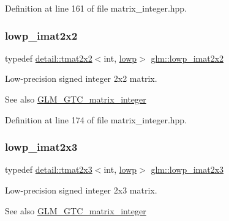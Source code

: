 Definition at line 161 of file matrix\+\_\+integer.\+hpp.

\mbox{\label{group__gtc__matrix__integer_ga05307630bc68a62132a82d1886a0b5e2}} 
\subsubsection{\texorpdfstring{lowp\+\_\+imat2x2}{lowp\_imat2x2}}
{\footnotesize\ttfamily typedef \hyperlink{structglm_1_1detail_1_1tmat2x2}{detail\+::tmat2x2}$<$int, \hyperlink{namespaceglm_a0f04f086094c747d227af4425893f545ae161af3fc695e696ce3bf69f7332bc2d}{lowp}$>$ \hyperlink{group__gtc__matrix__integer_ga05307630bc68a62132a82d1886a0b5e2}{glm\+::lowp\+\_\+imat2x2}}

Low-\/precision signed integer 2x2 matrix. \begin{DoxySeeAlso}{See also}
\hyperlink{group__gtc__matrix__integer}{G\+L\+M\+\_\+\+G\+T\+C\+\_\+matrix\+\_\+integer} 
\end{DoxySeeAlso}


Definition at line 174 of file matrix\+\_\+integer.\+hpp.

\mbox{\label{group__gtc__matrix__integer_ga5757953c508a6e05bf3573d6c099cf88}} 
\subsubsection{\texorpdfstring{lowp\+\_\+imat2x3}{lowp\_imat2x3}}
{\footnotesize\ttfamily typedef \hyperlink{structglm_1_1detail_1_1tmat2x3}{detail\+::tmat2x3}$<$int, \hyperlink{namespaceglm_a0f04f086094c747d227af4425893f545ae161af3fc695e696ce3bf69f7332bc2d}{lowp}$>$ \hyperlink{group__gtc__matrix__integer_ga5757953c508a6e05bf3573d6c099cf88}{glm\+::lowp\+\_\+imat2x3}}

Low-\/precision signed integer 2x3 matrix. \begin{DoxySeeAlso}{See also}
\hyperlink{group__gtc__matrix__integer}{G\+L\+M\+\_\+\+G\+T\+C\+\_\+matrix\+\_\+integer} 
\end{DoxySeeAlso}


